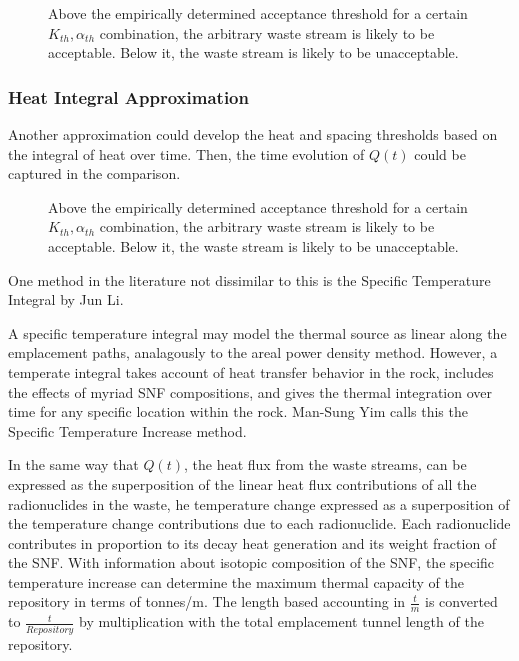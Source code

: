\begin{figure}[htb!]
  \begin{center}
    \def\svgwidth{.7\textwidth}
    
  \end{center}
  \caption{Above the empirically determined acceptance threshold for a certain 
  $K_{th}, \alpha_{th}$ combination, the arbitrary  waste stream is likely to be 
  acceptable. Below it, the waste stream is likely to be unacceptable. }
  \label{fig:acceptance}
\end{figure}

\subsubsection{Heat Integral Approximation}

Another approximation could develop the heat and spacing thresholds based on the 
integral of heat over time. Then, the time evolution of $Q(t)$ could be captured  
in the comparison. 

\begin{figure}[htb!]
  \begin{center}
    \def\svgwidth{.7\textwidth}
    
  \end{center}
  \caption{Above the empirically determined acceptance threshold for a certain 
  $K_{th}, \alpha_{th}$ combination, the arbitrary  waste stream is likely to be 
  acceptable. Below it, the waste stream is likely to be unacceptable. }
  \label{fig:acceptanceInt}
\end{figure}

One method in the literature not dissimilar to this is the Specific Temperature 
Integral by Jun Li\cite{li_specific_2008}. 

A specific temperature integral may model the thermal source as linear along the
emplacement paths, analagously to the areal power density method.
However, a temperate integral takes account of heat transfer behavior in the
rock, includes the effects of myriad SNF compositions, and gives the thermal
integration over time for any specific location within the rock.  Man-Sung Yim
calls this the Specific Temperature Increase method\cite{li_specific_2008}.

In the same way that $Q(t)$, the heat flux from the waste streams, can be
expressed as the superposition of the linear heat flux contributions of all the
radionuclides in the waste, he temperature change
expressed as a superposition of the temperature change contributions due to  
each radionuclide. Each radionuclide contributes in proportion to its
decay heat generation and its weight fraction of the SNF. With information
about isotopic composition of the SNF, the specific temperature increase can
determine the maximum thermal capacity of the repository in terms of tonnes/m.
The length based accounting in $\frac{t}{m}$ is converted to
$\frac{t}{Repository}$ by multiplication with the total emplacement tunnel
length of the repository. 


